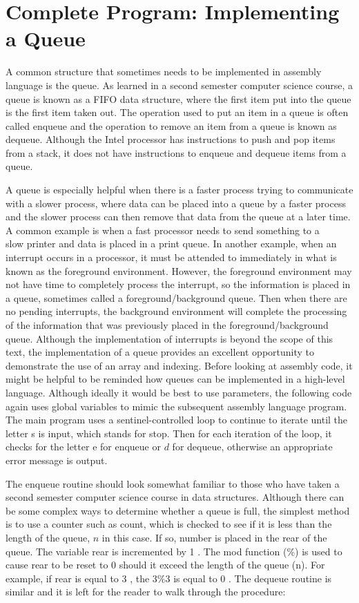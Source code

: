 \documentclass[10pt]{book}
\begin{document}
\section{Complete Program: Implementing a Queue}
A common structure that sometimes needs to be implemented in assembly language is the queue. As learned in a second semester computer science course, a queue is known as a FIFO data structure, where the first item put into the queue is the first item taken out. The operation used to put an item in a queue is often called enqueue and the operation to remove an item from a queue is known as dequeue. Although the Intel processor has instructions to push and pop items from a stack, it does not have instructions to enqueue and dequeue items from a queue.

A queue is especially helpful when there is a faster process trying to communicate with a slower process, where data can be placed into a queue by a faster process and the slower process can then remove that data from the queue at a later time. A common example is when a fast processor needs to send something to a\\
slow printer and data is placed in a print queue. In another example, when an interrupt occurs in a processor, it must be attended to immediately in what is known as the foreground environment. However, the foreground environment may not have time to completely process the interrupt, so the information is placed in a queue, sometimes called a foreground/background queue. Then when there are no pending interrupts, the background environment will complete the processing of the information that was previously placed in the foreground/background queue. Although the implementation of interrupts is beyond the scope of this text, the implementation of a queue provides an excellent opportunity to demonstrate the use of an array and indexing.
Before looking at assembly code, it might be helpful to be reminded how queues can be implemented in a high-level language. Although ideally it would be best to use parameters, the following code again uses global variables to mimic the subsequent assembly language program. The main program uses a sentinel-controlled loop to continue to iterate until the letter s is input, which stands for stop. Then for each iteration of the loop, it checks for the letter e for enqueue or $d$ for dequeue, otherwise an appropriate error message is output.

The enqueue routine should look somewhat familiar to those who have taken a second semester computer science course in data structures. Although there can be some complex ways to determine whether a queue is full, the simplest method is to use a counter such as count, which is checked to see if it is less than the length of the queue, $n$ in this case. If so, number is placed in the rear of the queue. The variable rear is incremented by 1 . The mod function (\%) is used to cause rear to be reset to 0 should it exceed the length of the queue (n). For example, if rear is equal to 3 , the $3 \% 3$ is equal to 0 . The dequeue routine is similar and it is left for the reader to walk through the procedure:
\end{document}
